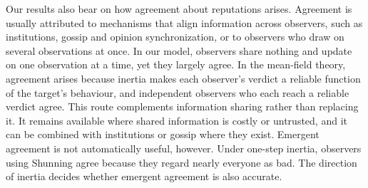 Our results also bear on how agreement about reputations arises. Agreement is usually attributed to mechanisms that align information across observers, such as institutions, gossip and opinion synchronization\cite{radzvilavicius2021,kawakatsu2024,murase2024synchronization}, or to observers who draw on several observations at once\cite{michelmata2024}. In our model, observers share nothing and update on one observation at a time, yet they largely agree. In the mean-field theory, agreement arises because inertia makes each observer's verdict a reliable function of the target's behaviour, and independent observers who each reach a reliable verdict agree. This route complements information sharing rather than replacing it. It remains available where shared information is costly or untrusted, and it can be combined with institutions or gossip where they exist. Emergent agreement is not automatically useful, however. Under one-step inertia, observers using Shunning agree because they regard nearly everyone as bad. The direction of inertia decides whether emergent agreement is also accurate.
